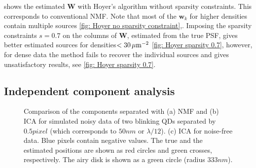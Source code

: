  shows the estimated $\bm{W}$ with Hoyer's algorithm without sparsity constraints. This corresponds to conventional NMF. Note that most of the $\bm{w}_k$ for higher densities contain multiple sources \autoref{fig: Hoyer no sparsity constraint}\bbb,\ccc. Imposing the sparsity constraints $s=0.7$ on the columns of $\bm{W}$, estimated from the true PSF, gives better estimated sources for densities$<30\, \mathrm{\mu m}^{-2}$  \autoref{fig: Hoyer sparsity 0.7}\aaa, however, for dense data the method fails to recover the individual sources and gives unsatisfactory results, see \autoref{fig: Hoyer sparsity 0.7}\ccc.

\afterpage{\clearpage}

\subsection{Independent component analysis\label{sub:ICA}}
\begin{figure}[!htb] %
	\newcommand{\sizefig}{.4}
	\centering
	\caption{Comparison of the components separated with (a) NMF and (b) ICA for	simulated noisy data of two blinking QDs separated by $0.5 \unit{pixel}$ (which corresponds to $50\unit{nm}$ or $\lambda/12$). (c) ICA for noise-free data.  Blue pixels contain negative values. The true and the estimated positions are shown as red circles and green crosses, respectively. The airy disk is shown as a green circle (radius $333\unit{nm}$).}
	\label{fig:Comparison of NMF and ICA}
\end{figure}

